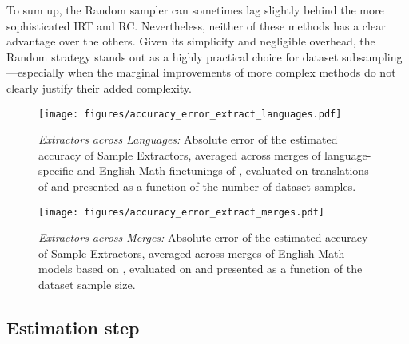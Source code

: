 To sum up, the Random sampler can sometimes lag slightly behind the more sophisticated IRT and RC. Nevertheless, neither of these methods has a clear advantage over the others. Given its simplicity and negligible overhead, the Random strategy stands out as a highly practical choice for dataset subsampling—especially when the marginal improvements of more complex methods do not clearly justify their added complexity.

\begin{figure}
    \texttt{[image: figures/accuracy\_error\_extract\_languages.pdf]}
    \caption{\textit{Extractors across Languages:} Absolute error of the estimated accuracy of Sample Extractors, averaged across merges of language-specific and English Math finetunings of , evaluated on translations of  and presented as a function of the number of dataset samples.}
    \label{fig:extractor_language}
\end{figure}

\begin{figure}
    \texttt{[image: figures/accuracy\_error\_extract\_merges.pdf]}
    \caption{\textit{Extractors across Merges:} Absolute error of the estimated accuracy of Sample Extractors, averaged across merges of English Math models based on , evaluated on  and presented as a function of the dataset sample size.}
    \label{fig:extractor_merges}
\end{figure}


\subsection{Estimation step} \label{app:estimation-step}

